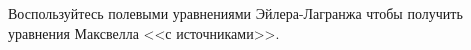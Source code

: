 \documentclass[__main__.tex]{subfiles}
\begin{document}
Воспользуйтесь полевыми уравнениями Эйлера-Лагранжа чтобы получить уравнения Максвелла <<с источниками>>.\\ 

\end{document}
